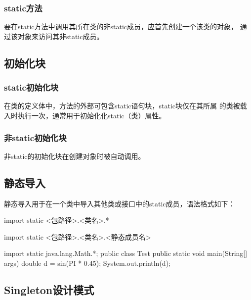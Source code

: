 \subsubsection{static方法}

要在static方法中调用其所在类的非static成员，应首先创建一个该类的对象，
通过该对象来访问其非static成员。



\subsection{初始化块}

\subsubsection{static初始化块}

在类的定义体中，方法的外部可包含static语句块，{\Red static块仅在其所属
  的类被载入时执行一次}，通常用于初始化化static（类）属性。

\subsubsection{非static初始化块}

非static的初始化块在创建对象时被自动调用。


\subsection{静态导入}

静态导入用于在一个类中导入其他类或接口中的static成员，语法格式如下：

\begin{javaCode}
  import static <包路径>.<类名>.*

  import static <包路径>.<类名>.<静态成员名>
\end{javaCode}


\begin{javaCode}
import static java.lang.Math.*;
public class Test {
  public static void main(String[] args) {
    double d = sin(PI * 0.45);
    System.out.println(d);
  }
}
\end{javaCode}

\subsection{Singleton设计模式}

